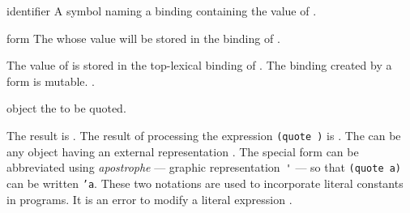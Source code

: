 \begin{optDefinition}
%
\Syntax
{}%
%
\begin{arguments}
    \item[identifier] A symbol naming a binding containing the value of
    .

    \item[form] The  whose value will be stored in the binding of
    .
\end{arguments}
%
\remarks%
The value of  is stored in the top-lexical binding of .
The binding created by a  form is mutable.
%
\seealso%
.

%
\Syntax
{}%
%
\begin{arguments}
    \item[object] the  to be quoted.
\end{arguments}
%
\result%
The result is .
%
\remarks%
The result of processing the expression {\tt (quote )} is
.  The  can be any object having an external
representation .  The special form
 can be abbreviated using {\em apostrophe} --- graphic
representation~\verb+'+ --- so that
{\tt (quote a)} can be written {\tt 'a}.  These two notations are used to
incorporate literal constants  in programs.
It is an error to modify a literal expression
.
\end{optDefinition}

